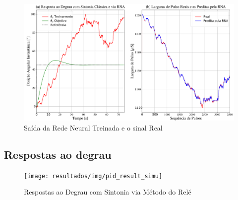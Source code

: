 \begin{figure}[H]
  \caption{Saída da Rede Neural Treinada e o sinal Real}
  \begin{center}
      \includegraphics[scale=0.35]{resultados/img/neural_output}
  \end{center}
  \label{fig:mpu6050_analisys}
\end{figure}



\subsection{Respostas ao degrau}

\begin{figure}[H]
  \caption{Respostas ao Degrau com Sintonia via Método do Relé}
  \begin{center}
      \texttt{[image: resultados/img/pid\_result\_simu]}
  \end{center}
  \label{fig:mpu6050_analisys}
\end{figure}



